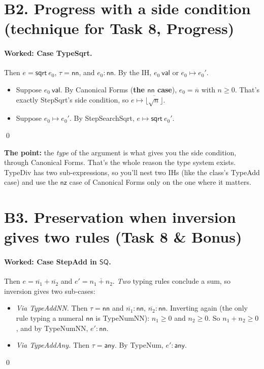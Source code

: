 \documentclass[11pt]{article}
\newcommand{\val}[1]{#1\ \mathsf{val}}
\newcommand{\stepto}[2]{#1 \mapsto #2}
\newcommand{\SQRT}[1]{\mathsf{sqrt}\ #1}
\newcommand{\NN}{\mathsf{nn}}
\newcommand{\ANY}{\mathsf{any}}
\newcommand{\NZ}{\mathsf{nz}}
\newcommand{\num}[1]{\overline{#1}}
\begin{document}
\section*{B2. Progress with a side condition \hfill (technique for Task 8, Progress)}

\paragraph{Worked: Case TypeSqrt.} Then $e=\SQRT{e_0}$, $\tau=\NN$, and
$e_0:\NN$. By the IH, $\val{e_0}$ or $\stepto{e_0}{e_0'}$.
\begin{itemize}
  \item Suppose $\val{e_0}$. By Canonical Forms (\textbf{the $\NN$ case}),
        $e_0=\num n$ with $n\ge 0$. That's exactly StepSqrt's side condition,
        so $\stepto{e}{\num{\lfloor\sqrt n\rfloor}}$.
  \item Suppose $\stepto{e_0}{e_0'}$. By StepSearchSqrt,
        $\stepto{e}{\SQRT{e_0'}}$.
\end{itemize}
\qed

\noindent\textbf{The point:} the \emph{type} of the argument is what gives
you the side condition, through Canonical Forms. That's the whole reason
the type system exists. TypeDiv has two sub-expressions, so you'll nest two
IHs (like the class's TypeAdd case) and use the $\NZ$ case of Canonical
Forms only on the one where it matters.

\section*{B3. Preservation when inversion gives two rules \hfill (Task 8 \& Bonus)}

\paragraph{Worked: Case StepAdd in $\mathsf{SQ}$.} Then $e=\num{n_1}+\num{n_2}$
and $e'=\num{n_1+n_2}$. \emph{Two} typing rules conclude a sum, so inversion
gives two sub-cases:
\begin{itemize}
  \item \emph{Via TypeAddNN.} Then $\tau=\NN$ and $\num{n_1}:\NN$,
        $\num{n_2}:\NN$. Inverting again (the only rule typing a numeral
        $\NN$ is TypeNumNN): $n_1\ge0$ and $n_2\ge0$. So $n_1+n_2\ge0$, and by
        TypeNumNN, $e':\NN$.
  \item \emph{Via TypeAddAny.} Then $\tau=\ANY$. By TypeNum, $e':\ANY$.
\end{itemize}
\qed
\end{document}
